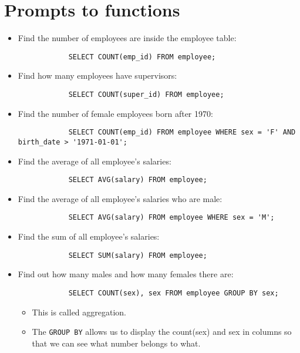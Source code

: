 \section{Prompts to functions}
\begin{itemize}
    \item Find the number of employees are inside the employee table:
        \begin{verbatim}
            SELECT COUNT(emp_id) FROM employee;
        \end{verbatim}
    
    \item Find how many employees have supervisors:
        \begin{verbatim}
            SELECT COUNT(super_id) FROM employee;
        \end{verbatim}
    
    \item Find the number of female employees born after 1970:
        \begin{verbatim}
            SELECT COUNT(emp_id) FROM employee WHERE sex = 'F' AND birth_date > '1971-01-01';
        \end{verbatim}
    
    \item Find the average of all employee's salaries:
        \begin{verbatim}
            SELECT AVG(salary) FROM employee;
        \end{verbatim}
    
    \item Find the average of all employee's salaries who are male:
        \begin{verbatim}
            SELECT AVG(salary) FROM employee WHERE sex = 'M';
        \end{verbatim}
    
    \item Find the sum of all employee's salaries:
        \begin{verbatim}
            SELECT SUM(salary) FROM employee;
        \end{verbatim}
    
    \item Find out how many males and how many females there are:
        \begin{verbatim}
            SELECT COUNT(sex), sex FROM employee GROUP BY sex;
        \end{verbatim}
        \begin{itemize}
            \item This is called aggregation.
            \item The \texttt{GROUP BY} allows us to display the count(sex) and sex in columns so that we can see what number belongs to what.
        \end{itemize}
    

\end{itemize}
